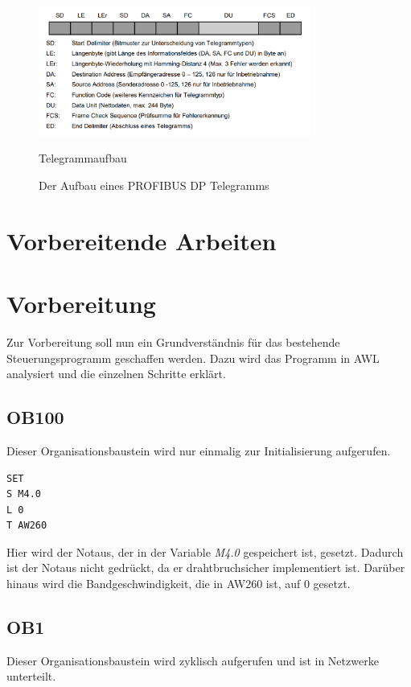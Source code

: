 \documentclass{report}
\begin{document}
\begin{figure}[H]
        \begin{center}
            \includegraphics[width = 0.8\textwidth]{assets/img/Telegram.PNG}
               \caption{Telegrammaufbau}
        \end{center}
        \label{fig:telegramm}
        \caption{Der Aufbau eines PROFIBUS DP Telegramms}
\end{figure}

\section{Vorbereitende Arbeiten}

\section{Vorbereitung}
Zur Vorbereitung soll nun ein Grundverständnis für das bestehende Steuerungsprogramm geschaffen werden. Dazu wird das Programm in AWL analysiert und die einzelnen Schritte erklärt.

\subsection{OB100}
\label{sec:ob100}
Dieser Organisationsbaustein wird nur einmalig zur Initialisierung aufgerufen.

\begin{lstlisting}
SET
S M4.0 
L 0
T AW260
\end{lstlisting}
Hier wird der Notaus, der in der Variable \textit{M4.0} gespeichert ist, gesetzt. Dadurch ist der Notaus nicht gedrückt, da er drahtbruchsicher implementiert ist. Darüber hinaus wird die Bandgeschwindigkeit, die in AW260 ist, auf 0 gesetzt.

\subsection{OB1}
Dieser Organisationsbaustein wird zyklisch aufgerufen und ist in Netzwerke unterteilt.
\end{document}
